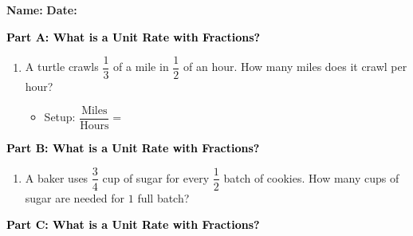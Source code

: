 \documentclass[12pt, letterpaper, fleqn]{article}
\newcommand{\blank}{\underline{\hspace{2.2cm}}}
\newcommand{\blanklong}{\underline{\hspace{6.5cm}}}
\begin{document}
\textbf{Name:} \underline{\hspace{5cm}}
\hfill
\textbf{Date:} \underline{\hspace{3cm}}\\

\begin{tcolorbox}[colback=customteal!20]
\large\textcolor{black}{\textbf{Part A: What is a Unit Rate with Fractions?}}
\end{tcolorbox}

\vspace{3mm}

\begin{enumerate}[itemsep=2.2cm, leftmargin=0.6cm]
\item A turtle crawls $\dfrac{1}{3}$ of a mile in $\dfrac{1}{2}$ of an hour. How many miles does it crawl per hour?
\vspace{1cm}
\begin{itemize}
\item Setup: $\dfrac{\text{Miles}}{\text{Hours}} = $ \blanklong
    \vspace{0.5cm}
\end{itemize}
\end{enumerate}

\newpage

\begin{tcolorbox}[colback=customteal!20]
\large\textcolor{black}{\textbf{Part B: What is a Unit Rate with Fractions?}}
\end{tcolorbox}

\vspace{3mm}

\begin{enumerate}[itemsep=2.2cm, leftmargin=0.6cm, resume]
\begin{itemize}
\item Answer: \blank miles per hour
\end{itemize}
\item A baker uses $\dfrac{3}{4}$ cup of sugar for every $\dfrac{1}{2}$ batch of cookies. How many cups of sugar are needed for $1$ full batch?
\vspace{1cm}
\end{enumerate}

\newpage

\begin{tcolorbox}[colback=customteal!20]
\large\textcolor{black}{\textbf{Part C: What is a Unit Rate with Fractions?}}
\end{tcolorbox}
\end{document}
